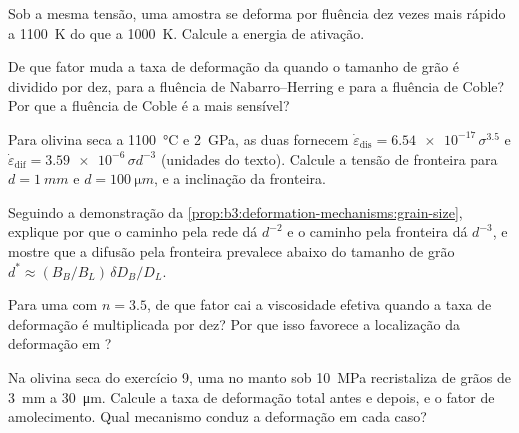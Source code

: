 \begin{exercise}[$\star\star$]\label{exo:b3:deformation-mechanisms:7}
Sob a mesma tensão, uma amostra se deforma por fluência dez vezes mais rápido a \qty{1100}{K} do que a
\qty{1000}{K}. Calcule a energia de ativação.
\end{exercise}

\begin{exercise}[$\star\star$]\label{exo:b3:deformation-mechanisms:8}
De que fator muda a taxa de deformação da  quando o tamanho de grão
é dividido por dez, para a fluência de Nabarro--Herring e para a fluência de Coble? Por que a fluência de Coble
é a mais sensível?
\end{exercise}

\begin{exercise}[$\star\star$]\label{exo:b3:deformation-mechanisms:9}
Para olivina seca a \qty{1100}{\celsius} e \qty{2}{GPa}, as duas  fornecem
$\dot\varepsilon_{\mathrm{dis}} = \num{6.54e-17}\,\sigma^{3.5}$ e
$\dot\varepsilon_{\mathrm{dif}} = \num{3.59e-6}\,\sigma d^{-3}$ (unidades do
texto). Calcule a tensão de fronteira para $d = \qty{1}{mm}$ e $d =
\qty{100}{\micro m}$, e a inclinação da fronteira.
\end{exercise}

\begin{exercise}[$\star\star\star$]\label{exo:b3:deformation-mechanisms:10}
Seguindo a demonstração da \cref{prop:b3:deformation-mechanisms:grain-size},
explique por que o caminho pela rede dá $d^{-2}$ e o caminho pela fronteira dá $d^{-3}$, e
mostre que a difusão pela fronteira prevalece abaixo do tamanho de grão $d^* \approx
(B_B/B_L)\,\delta D_B/D_L$.
\end{exercise}

\begin{exercise}[$\star\star\star$]\label{exo:b3:deformation-mechanisms:11}
Para uma  com $n = 3.5$, de que fator cai a viscosidade efetiva quando a
taxa de deformação é multiplicada por dez? Por que isso favorece a
localização da deformação em ?
\end{exercise}

\begin{exercise}[$\star\star\star$]\label{exo:b3:deformation-mechanisms:12}
Na olivina seca do exercício 9, uma  no manto sob \qty{10}{MPa}
recristaliza de grãos de \qty{3}{mm} a \qty{30}{\micro m}. Calcule a taxa de deformação total
antes e depois, e o fator de amolecimento. Qual mecanismo
conduz a deformação em cada caso?
\end{exercise}

